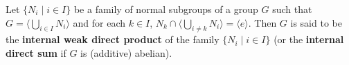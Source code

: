 \begin{definition}
Let $\{N_i \mid i \in I\}$ be a family of normal subgroups of a group $G$ such that $G = \langle \bigcup_{i \in I} N_i \rangle$ and for each $k \in I$, $N_k \cap \langle \bigcup_{i \neq k} N_i \rangle = \langle e \rangle$. Then $G$ is said to be the \textbf{internal weak direct product} of the family $\{N_i \mid i \in I\}$ (or the \textbf{internal direct sum} if $G$ is (additive) abelian).
\end{definition}

